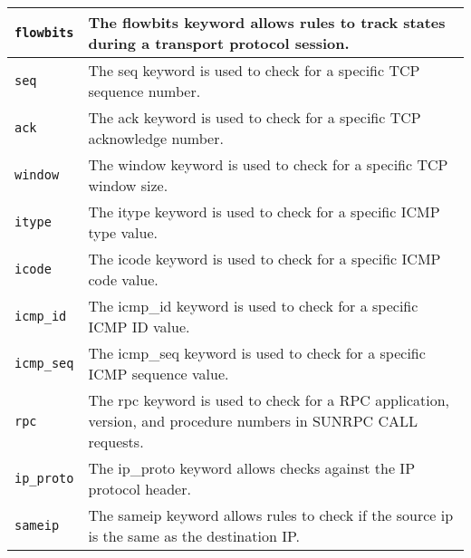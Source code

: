 \documentclass[english]{report}
\begin{document}
\begin{center}
\begin{longtable}[h]{| p{1in} | p{4.5in} |}
\hline
\texttt{flowbits} &

The flowbits keyword allows rules to track states during a transport protocol
session. \\

\hline
\texttt{seq} &

The seq keyword is used to check for a specific TCP sequence number. \\

\hline
\texttt{ack} &

The ack keyword is used to check for a specific TCP acknowledge number. \\

\hline
\texttt{window} &

The window keyword is used to check for a specific TCP window size. \\

\hline
\texttt{itype} &

The itype keyword is used to check for a specific ICMP type value. \\

\hline
\texttt{icode} &

The icode keyword is used to check for a specific ICMP code value. \\

\hline
\texttt{icmp\_id} &

The icmp\_id keyword is used to check for a specific ICMP ID value. \\

\hline
\texttt{icmp\_seq} &

The icmp\_seq keyword is used to check for a specific ICMP sequence value. \\

\hline
\texttt{rpc} &

The rpc keyword is used to check for a RPC application, version, and procedure
numbers in SUNRPC CALL requests. \\

\hline
\texttt{ip\_proto} &

The ip\_proto keyword allows checks against the IP protocol header. \\

\hline
\texttt{sameip} &

The sameip keyword allows rules to check if the source ip is the same as the
destination IP. \\

\hline
\end{longtable}
\end{center}
\end{document}
